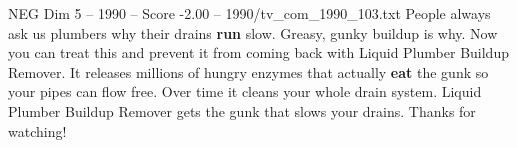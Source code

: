 \begin{textsample}{NEG Dim 5 – 1990 – Score -2.00 – 1990/tv\_com\_1990\_103.txt}  \label{ex:f5_neg_074}
People always ask us plumbers why their drains \textbf{run} slow.
Greasy, gunky buildup is why.
Now you can treat this and prevent it from coming back with Liquid Plumber Buildup Remover.
It releases millions of hungry enzymes that actually \textbf{eat} the gunk so your pipes can flow free.
Over time it cleans your whole drain system.
Liquid Plumber Buildup Remover gets the gunk that slows your drains.
Thanks for watching!

\end{textsample}

